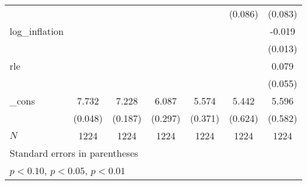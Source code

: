 {\begin{tabular}{l*{6}{c}}
            &                     &                     &                     &                     &     (0.086)         &     (0.083)         \\
\addlinespace
log\_inflation&                     &                     &                     &                     &                     &      -0.019         \\
            &                     &                     &                     &                     &                     &     (0.013)         \\
\addlinespace
rle         &                     &                     &                     &                     &                     &       0.079         \\
            &                     &                     &                     &                     &                     &     (0.055)         \\
\addlinespace
\_cons      &       7.732\sym{***}&       7.228\sym{***}&       6.087\sym{***}&       5.574\sym{***}&       5.442\sym{***}&       5.596\sym{***}\\
            &     (0.048)         &     (0.187)         &     (0.297)         &     (0.371)         &     (0.624)         &     (0.582)         \\
\midrule
\(N\)       &        1224         &        1224         &        1224         &        1224         &        1224         &        1224         \\
\bottomrule
\multicolumn{7}{l}{\footnotesize Standard errors in parentheses}\\
\multicolumn{7}{l}{\footnotesize \sym{*} \(p<0.10\), \sym{**} \(p<0.05\), \sym{***} \(p<0.01\)}\\
\end{tabular}
}

